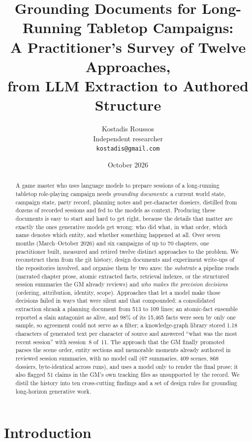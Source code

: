 \documentclass[11pt]{article}
\title{Grounding Documents for Long-Running Tabletop Campaigns:\\
A Practitioner's Survey of Twelve Approaches,\\
from LLM Extraction to Authored Structure}
\author{Kostadis Roussos\\
Independent researcher\\
\texttt{kostadis@gmail.com}}
\date{October 2026}
\begin{document}
\maketitle

\begin{abstract}
A game master who uses language models to prepare sessions of a long-running tabletop role-playing
campaign needs \emph{grounding documents}: a current world state, campaign state, party record,
planning notes and per-character dossiers, distilled from dozens of recorded sessions and fed to the
models as context. Producing these documents is easy to start and hard to get right, because the
details that matter are exactly the ones generative models get wrong: who did what, in what order,
which name denotes which entity, and whether something happened at all. Over seven months
(March--October 2026) and six campaigns of up to 70 chapters, one practitioner built, measured and
retired twelve distinct approaches to the problem. We reconstruct them from the git history,
design documents and experiment write-ups of the repositories involved, and organise them by two
axes: the \emph{substrate} a pipeline reads (narrated chapter prose, atomic extracted facts,
retrieval indexes, or the structured session summaries the GM already reviews) and \emph{who makes
the precision decisions} (ordering, attribution, identity, scope). Approaches that let a model make
those decisions failed in ways that were silent and that compounded: a consolidated extraction shrank
a planning document from 513 to 109 lines; an atomic-fact ensemble reported a slain antagonist as
alive, and 98\% of its 15{,}465 facts were seen by only one sample, so agreement could not serve
as a filter; a knowledge-graph library stored 1.18 characters of generated text per character of
source and answered ``what was the most recent session'' with session~8 of~11. The approach that the
GM finally promoted parses the scene order, entity sections and memorable moments already authored in
reviewed session summaries, with no model call (67 summaries, 409 scenes, 868 dossiers,
byte-identical across runs), and uses a model only to render the final prose; it also flagged 51
claims in the GM's own tracking files as unsupported by the record. We distil the history into ten
cross-cutting findings and a set of design rules for grounding long-horizon generative work.
\end{abstract}

\section{Introduction}
\end{document}
